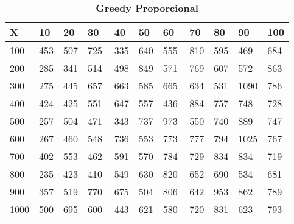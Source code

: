\documentclass[10pt,letterpaper]{article}
\begin{document}
\begin{center}
\begin{table}\renewcommand{\arraystretch}{2.5}
\caption{\large \textbf{Greedy Proporcional}}
\centering
\begin{tabular} { |m{0.5cm}|m{1.3cm}|m{1.3cm}|m{1.3cm}|m{1.3cm}|m{1.3cm}|m{1.3cm}|m{1.3cm}|m{1.3cm}|m{1.3cm}|m{1.3cm}|} 
\hline
\rowcolor{Gray}
\centering \textbf{X} & \centering \textbf{10} & \centering \textbf{20} & \centering \textbf{30}\ & \centering \textbf{40} & \centering \textbf{50} & \centering \textbf{60}\ & \centering \textbf{70} & \centering \textbf{80} & \centering \textbf{90}\ & \textbf{100} \\\hline
\cellcolor{Gray}100 & \Large 453 & \Large 507 & \Large 725 & \Large 335 & \Large 640 & \Large 555 & \Large 810 & \Large 595 & \Large 469 & \Large 684 \\
\hline
\cellcolor{Gray}200 & \Large 285 & \Large 341 & \Large 514 & \Large 498 & \Large 849 & \Large 571 & \Large 769 & \Large 607 & \Large 572 & \Large 863 \\
\hline
\cellcolor{Gray}300 & \Large 275 & \Large 445 & \Large 657 & \Large 663 & \Large 585 & \Large 665 & \Large 634 & \Large 531 & \Large 1090 & \Large 786 \\
\hline
\cellcolor{Gray}400 & \Large 424 & \Large 425 & \Large 551 & \Large 647 & \Large 557 & \Large 436 & \Large 884 & \Large 757 & \Large 748 & \Large 728 \\
\hline
\cellcolor{Gray}500 & \Large 257 & \Large 504 & \Large 471 & \Large 343 & \Large 737 & \Large 973 & \Large 550 & \Large 740 & \Large 889 & \Large 747 \\
\hline
\cellcolor{Gray}600 & \Large 267 & \Large 460 & \Large 548 & \Large 736 & \Large 553 & \Large 773 & \Large 777 & \Large 794 & \Large 1025 & \Large 767 \\
\hline
\cellcolor{Gray}700 & \Large 402 & \Large 553 & \Large 462 & \Large 591 & \Large 570 & \Large 784 & \Large 729 & \Large 834 & \Large 834 & \Large 719 \\
\hline
\cellcolor{Gray}800 & \Large 235 & \Large 423 & \Large 410 & \Large 549 & \Large 630 & \Large 820 & \Large 652 & \Large 690 & \Large 534 & \Large 681 \\
\hline
\cellcolor{Gray}900 & \Large 357 & \Large 519 & \Large 770 & \Large 675 & \Large 504 & \Large 806 & \Large 642 & \Large 953 & \Large 862 & \Large 789 \\
\hline
\cellcolor{Gray}1000 & \Large 500 & \Large 695 & \Large 600 & \Large 443 & \Large 621 & \Large 580 & \Large 720 & \Large 831 & \Large 623 & \Large 793 \\
\hline
\end{tabular} \\
\end{table}
\end{center}
\end{document}
